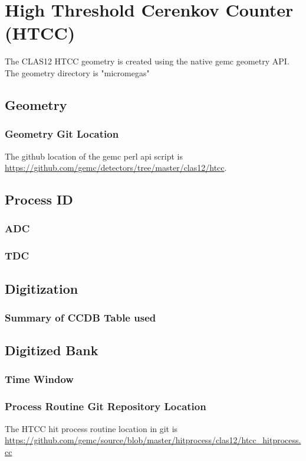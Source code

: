 \section{High Threshold Cerenkov Counter (HTCC)}

The CLAS12 HTCC geometry is created using the native gemc geometry API.
The geometry directory is "micromegas"


\subsection{Geometry}

\subsubsection{Geometry Git Location}
The github location of the gemc perl api script is \url{https://github.com/gemc/detectors/tree/master/clas12/htcc}.

\subsection{Process ID}
\subsubsection{ADC}
\subsubsection{TDC}

\subsection{Digitization}


\subsubsection{Summary of CCDB Table used}

\subsection{Digitized Bank}

\subsubsection{Time Window}

\subsubsection{Process Routine Git Repository Location}


The HTCC hit process routine location in git is \url{https://github.com/gemc/source/blob/master/hitprocess/clas12/htcc_hitprocess.cc}
